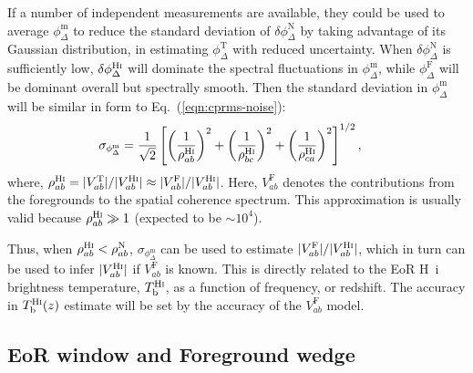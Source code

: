 \documentclass[
reprint,
superscriptaddress,
amsmath,
amssymb,
aps,
prd
]{revtex4-1}
\begin{document}
If a number of independent measurements are available, they could be used to average $\phi_\Delta^\textrm{m}$ to reduce the standard deviation of $\delta\phi_\Delta^\textrm{N}$ by taking advantage of its Gaussian distribution, in estimating $\phi_\Delta^\textrm{T}$ with reduced uncertainty. When $\delta\phi_\Delta^\textrm{N}$ is sufficiently low, $\delta\phi_\Delta^\textrm{H{\sc i}}$ will dominate the spectral fluctuations in $\phi_\Delta^\textrm{m}$, while $\phi_\Delta^\textrm{F}$ will be dominant overall but spectrally smooth. Then the standard deviation in $\phi_\Delta^\textrm{m}$ will be similar in form to Eq.~(\ref{eqn:cprms-noise}):
\begin{align}
  \sigma_{\phi_\Delta^\textrm{m}} &= \frac{1}{\sqrt{2}}\left[\left(\frac{1}{\rho_{ab}^\textrm{H{\sc i}}}\right)^2 + \left(\frac{1}{\rho_{bc}^\textrm{H{\sc i}}}\right)^2 + \left(\frac{1}{\rho_{ca}^\textrm{H{\sc i}}}\right)^2\right]^{1/2}, \label{eqn:cprms-EoR}
\end{align}
where, $\rho_{ab}^\textrm{H{\sc i}} = |V_{ab}^\textrm{T}|/|V_{ab}^\textrm{H{\sc i}}| \approx |V_{ab}^\textrm{F}|/|V_{ab}^\textrm{H{\sc i}}|$. Here, $V_{ab}^\textrm{F}$ denotes the contributions from the foregrounds to the spatial coherence spectrum. This approximation is usually valid because $\rho_{ab}^\textrm{H{\sc i}} \gg 1$ (expected to be $\sim 10^4$). 

Thus, when $\rho_{ab}^\textrm{H{\sc i}} < \rho_{ab}^\textrm{N}$, $\sigma_{\phi_\Delta^\textrm{m}}$ can be used to estimate $|V_{ab}^\textrm{F}|/|V_{ab}^\textrm{H{\sc i}}|$, which in turn can be used to infer $|V_{ab}^\textrm{H{\sc i}}|$ if $V_{ab}^\textrm{F}$ is known. This is directly related to the EoR H~{\sc i} brightness temperature, $T_\textrm{b}^\textrm{H{\sc i}}$, as a function of frequency, or redshift. The accuracy in $T_\textrm{b}^\textrm{H{\sc i}}(z)$ estimate will be set by the accuracy of the $V_{ab}^\textrm{F}$ model.


\subsection{EoR window and Foreground wedge}\label{sec:cp-FG-wedge}
\end{document}
